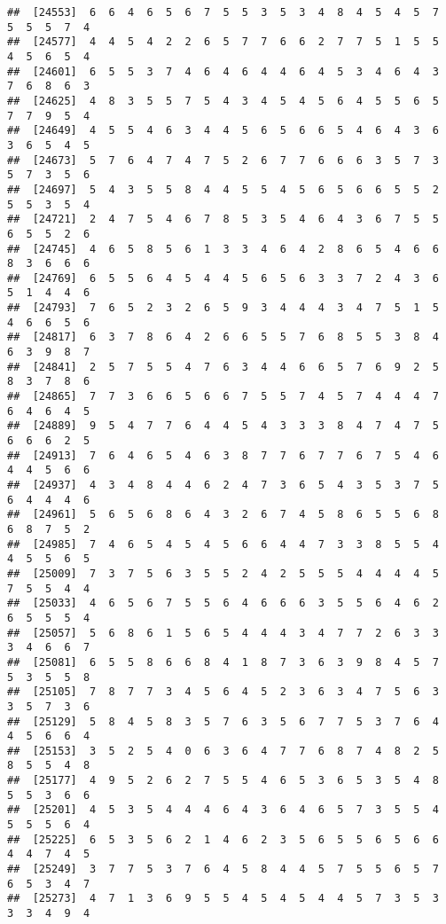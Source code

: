 \documentclass[
]{book}
\begin{document}
\begin{verbatim}
##  [24553]  6  6  4  6  5  6  7  5  5  3  5  3  4  8  4  5  4  5  7  5  5  5  7  4
##  [24577]  4  4  5  4  2  2  6  5  7  7  6  6  2  7  7  5  1  5  5  4  5  6  5  4
##  [24601]  6  5  5  3  7  4  6  4  6  4  4  6  4  5  3  4  6  4  3  7  6  8  6  3
##  [24625]  4  8  3  5  5  7  5  4  3  4  5  4  5  6  4  5  5  6  5  7  7  9  5  4
##  [24649]  4  5  5  4  6  3  4  4  5  6  5  6  6  5  4  6  4  3  6  3  6  5  4  5
##  [24673]  5  7  6  4  7  4  7  5  2  6  7  7  6  6  6  3  5  7  3  5  7  3  5  6
##  [24697]  5  4  3  5  5  8  4  4  5  5  4  5  6  5  6  6  5  5  2  5  5  3  5  4
##  [24721]  2  4  7  5  4  6  7  8  5  3  5  4  6  4  3  6  7  5  5  6  5  5  2  6
##  [24745]  4  6  5  8  5  6  1  3  3  4  6  4  2  8  6  5  4  6  6  8  3  6  6  6
##  [24769]  6  5  5  6  4  5  4  4  5  6  5  6  3  3  7  2  4  3  6  5  1  4  4  6
##  [24793]  7  6  5  2  3  2  6  5  9  3  4  4  4  3  4  7  5  1  5  4  6  6  5  6
##  [24817]  6  3  7  8  6  4  2  6  6  5  5  7  6  8  5  5  3  8  4  6  3  9  8  7
##  [24841]  2  5  7  5  5  4  7  6  3  4  4  6  6  5  7  6  9  2  5  8  3  7  8  6
##  [24865]  7  7  3  6  6  5  6  6  7  5  5  7  4  5  7  4  4  4  7  6  4  6  4  5
##  [24889]  9  5  4  7  7  6  4  4  5  4  3  3  3  8  4  7  4  7  5  6  6  6  2  5
##  [24913]  7  6  4  6  5  4  6  3  8  7  7  6  7  7  6  7  5  4  6  4  4  5  6  6
##  [24937]  4  3  4  8  4  4  6  2  4  7  3  6  5  4  3  5  3  7  5  6  4  4  4  6
##  [24961]  5  6  5  6  8  6  4  3  2  6  7  4  5  8  6  5  5  6  8  6  8  7  5  2
##  [24985]  7  4  6  5  4  5  4  5  6  6  4  4  7  3  3  8  5  5  4  4  5  5  6  5
##  [25009]  7  3  7  5  6  3  5  5  2  4  2  5  5  5  4  4  4  4  5  7  5  5  4  4
##  [25033]  4  6  5  6  7  5  5  6  4  6  6  6  3  5  5  6  4  6  2  6  5  5  5  4
##  [25057]  5  6  8  6  1  5  6  5  4  4  4  3  4  7  7  2  6  3  3  3  4  6  6  7
##  [25081]  6  5  5  8  6  6  8  4  1  8  7  3  6  3  9  8  4  5  7  5  3  5  5  8
##  [25105]  7  8  7  7  3  4  5  6  4  5  2  3  6  3  4  7  5  6  3  3  5  7  3  6
##  [25129]  5  8  4  5  8  3  5  7  6  3  5  6  7  7  5  3  7  6  4  4  5  6  6  4
##  [25153]  3  5  2  5  4  0  6  3  6  4  7  7  6  8  7  4  8  2  5  8  5  5  4  8
##  [25177]  4  9  5  2  6  2  7  5  5  4  6  5  3  6  5  3  5  4  8  5  5  3  6  6
##  [25201]  4  5  3  5  4  4  4  6  4  3  6  4  6  5  7  3  5  5  4  5  5  5  6  4
##  [25225]  6  5  3  5  6  2  1  4  6  2  3  5  6  5  5  6  5  6  6  4  4  7  4  5
##  [25249]  3  7  7  5  3  7  6  4  5  8  4  4  5  7  5  5  6  5  7  6  5  3  4  7
##  [25273]  4  7  1  3  6  9  5  5  4  5  4  5  4  4  5  7  3  5  3  3  3  4  9  4

\end{verbatim}
\end{document}
